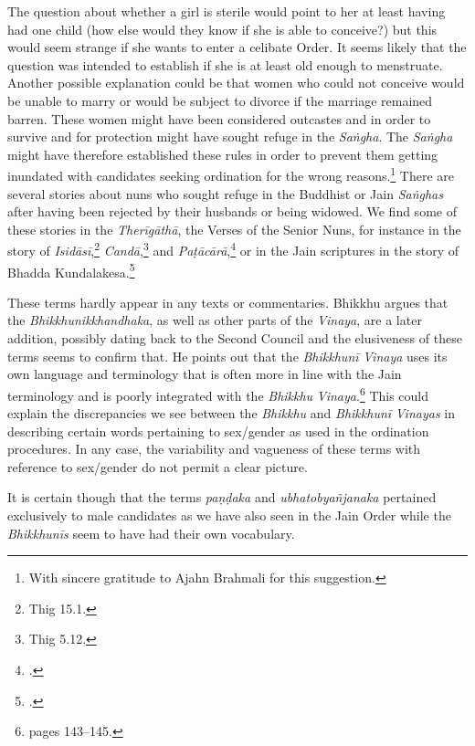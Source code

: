 The question about whether a girl is sterile would point to her at least having had one child (how else would they know if she is able to conceive?) but this would seem strange if she wants to enter a celibate Order. It seems likely that the question was intended to establish if she is at least old enough to menstruate. Another possible explanation could be that women who could not conceive would be unable to marry or would be subject to divorce if the marriage remained barren. These women might have been considered outcastes and in order to survive and for protection might have sought refuge in the \textit{Saṅgha}. The \textit{Saṅgha} might have therefore established these rules in order to prevent them getting inundated with candidates seeking ordination for the wrong reasons.\footnote{With sincere gratitude to Ajahn Brahmali for this suggestion.} There are several stories about nuns who sought refuge in the Buddhist or Jain \textit{Saṅghas} after having been rejected by their husbands or being widowed. We find some of these stories in the \textit{Therīgāthā}, the Verses of the Senior Nuns, for instance in the story of \textit{Isidāsī},\footnote{Thig 15.1.} \textit{Candā},\footnote{Thig 5.12.} and \textit{Paṭācārā},\footnote{\cite{hecker}.} or in the Jain scriptures in the story of Bhadda Kundalakesa.\footnote{\cite{hecker}.}

These terms hardly appear in any texts or commentaries. Bhikkhu \cite{sujato2009} argues that the \textit{Bhikkhunikkhandhaka}, as well as other parts of the \textit{Vinaya}, are a later addition, possibly dating back to the Second Council and the elusiveness of these terms seems to confirm that. He points out that the \textit{Bhikkhunī} \textit{Vinaya} uses its own language and terminology that is often more in line with the Jain terminology and is poorly integrated with the \textit{Bhikkhu} \textit{Vinaya}.\footnote{\cite{sujato2009} pages 143–145.} This could explain the discrepancies we see between the \textit{Bhikkhu} and \textit{Bhikkhunī} \textit{Vinayas} in describing certain words pertaining to sex/gender as used in the ordination procedures. In any case, the variability and vagueness of these terms with reference to sex/gender do not permit a clear picture. 

It is certain though that the terms \textit{paṇḍaka} and \textit{ubhatob­yañ­janaka} pertained exclusively to male candidates as we have also seen in the Jain Order while the \textit{Bhikkhunīs} seem to have had their own vocabulary.

